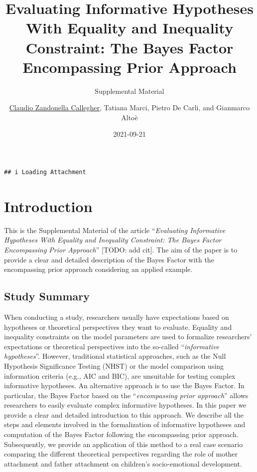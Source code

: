 \documentclass[
]{book}
\title{Evaluating Informative Hypotheses With Equality and Inequality Constraint: The Bayes Factor Encompassing Prior Approach}
\subtitle{Supplemental Material}
\author{\href{https://claudiozandonella.netlify.app/}{Claudio Zandonella Callegher}, Tatiana Marci, Pietro De Carli, and Gianmarco Altoè}
\date{2021-09-21}
\begin{document}
\maketitle

{
\setcounter{tocdepth}{1}
\tableofcontents
}
\begin{verbatim}
## i Loading Attachment
\end{verbatim}

\hypertarget{introduction}{%
\chapter*{Introduction}\label{introduction}}

This is the Supplemental Material of the article ``\emph{Evaluating Informative Hypotheses With Equality and Inequality Constraint: The Bayes Factor Encompassing Prior Approach}'' {[}TODO: add cit{]}. The aim of the paper is to provide a clear and detailed description of the Bayes Factor with the encompassing prior approach considering an applied example.

\hypertarget{study-summary}{%
\section*{Study Summary}\label{study-summary}}

When conducting a study, researchers usually have expectations based on hypotheses or theoretical perspectives they want to evaluate. Equality and inequality constraints on the model parameters are used to formalize researchers' expectations or theoretical perspectives into the so-called ``\emph{informative hypotheses}''. However, traditional statistical approaches, such as the Null Hypothesis Significance Testing (NHST) or the model comparison using information criteria (e.g., AIC and BIC), are unsuitable for testing complex informative hypotheses. An alternative approach is to use the Bayes Factor. In particular, the Bayes Factor based on the ``\emph{encompassing prior approach}'' allows researchers to easily evaluate complex informative hypotheses. In this paper we provide a clear and detailed introduction to this approach. We describe all the steps and elements involved in the formalization of informative hypotheses and computation of the Bayes Factor following the encompassing prior approach. Subsequently, we provide an application of this method to a real case scenario comparing the different theoretical perspectives regarding the role of mother attachment and father attachment on children's socio-emotional development.
\end{document}

